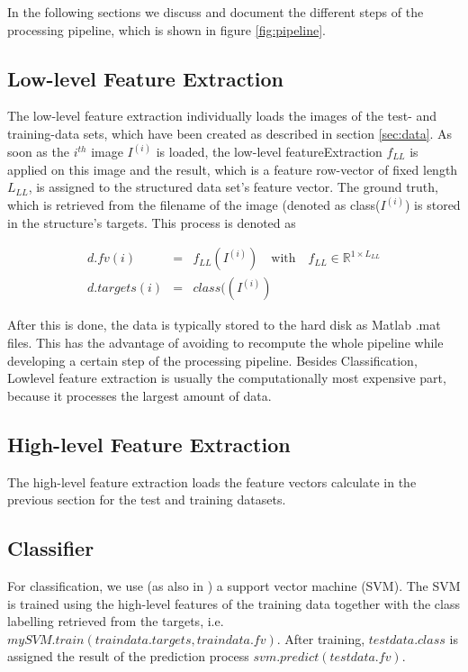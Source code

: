 \documentclass[10pt,twocolumn,letterpaper]{article}
\begin{document}
In the following sections we discuss and document the different steps of the processing pipeline, which is shown in figure \ref{fig:pipeline}.

\subsection{Low-level Feature Extraction}
The low-level feature extraction individually loads the images of the test- and training-data sets, which have been created as described in section \ref{sec:data}. As soon as the $i^{th}$ image $I^{(i)}$ is loaded, the low-level featureExtraction $f_{LL}$ is applied on this image and the result, which is a feature row-vector of fixed length $L_{LL}$, is assigned to the structured data set's feature vector. The ground truth, which is retrieved from the filename of the image (denoted as class($I^{(i)}$) is stored in the structure's targets. This process is denoted as 

\begin{small}

\begin{eqnarray}
d.fv(i) & = & f_{LL}(I^{(i)}) \quad \text{with} \quad f_{LL} \in \mathbb{R}^{1 \times L_{LL}} \\
d.targets(i)& = &class((I^{(i)})
\end{eqnarray}  

\end{small}

After this is done, the data is typically stored to the hard disk as Matlab .mat files. This has the advantage of avoiding to recompute the whole pipeline while developing a certain step of the processing pipeline. Besides Classification, Lowlevel feature extraction is usually the computationally most expensive part, because it processes the largest amount of data.
\subsection{High-level Feature Extraction}
The high-level feature extraction loads the feature vectors calculate in the previous section for the test and training datasets.


\subsection{Classifier}
For classification, we use (as also in \cite{indoorScenes}) a support vector machine (SVM). The SVM is trained using the high-level features of the training data together with the class labelling retrieved from the targets, i.e. $mySVM.train(traindata.targets, traindata.fv)$. After training, $testdata.class$ is assigned the result of the prediction process $svm.predict(testdata.fv)$. 
\end{document}
